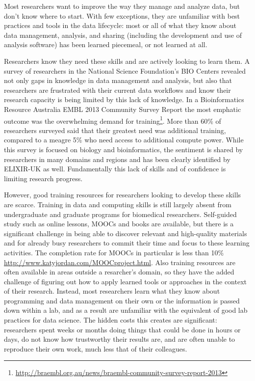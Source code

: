 \documentclass[15]{idcc}
\begin{document}
Most researchers want to improve the way they manage and analyze data, but don't know where to start.  With
few exceptions, they are unfamiliar with best practices and tools in the data lifecycle: most or all of what they know about data
management, analysis, and sharing (including the development and use of analysis software) has been learned piecemeal, or not learned
at all.

Researchers know they need these skills and are actively looking to learn them. A survey of researchers in the National Science Foundation's BIO Centers revealed not only gaps in knowledge in data management and analysis, but also that researchers are frustrated with
their current data workflows and know their research capacity is being limited by this lack of knowledge. In a Bioinformatics Resource Australia EMBL 2013 Community Survey Report the most emphatic outcome was the overwhelming demand for training\footnote{\url{http://braembl.org.au/news/braembl-community-survey-report-2013}}. More than 60\% of researchers surveyed said that their greatest need was additional training, compared to a meagre 5\% who need access to additional compute power.  While this survey is focused on biology and bioinformatics, the sentiment is shared by researchers in many domains and regions and has been clearly identified by ELIXIR-UK as well. Fundamentally this lack of skills and of confidence is limiting research progress.

However, good training resources for researchers looking to develop these skills are scarce. Training in data and computing skills is still
largely absent from undergraduate and graduate programs for biomedical researchers. Self-guided study such as online lessons,
MOOCs and books are available, but there is a significant challenge in being able to discover relevant and high-quality
 materials and for already busy researchers to commit their time and focus to these learning activities. The completion rate for MOOCs in particular is less than 10\% \url{http://www.katyjordan.com/MOOCproject.html}. Also training resources are often available in areas outside a resarcher's domain, so they have the added challenge of figuring out how to apply learned tools or approaches in the context of their research. Instead, most researchers
learn what they know about programming and data management on their own or the information is passed down within a lab,
and as a result are unfamiliar with the equivalent of good lab practices for data science.  The hidden costs this creates are significant:
researchers spent weeks or months doing things that could be done in hours or days, do not know how trustworthy their results are, and
are often unable to reproduce their own work, much less that of their colleagues.
\end{document}
